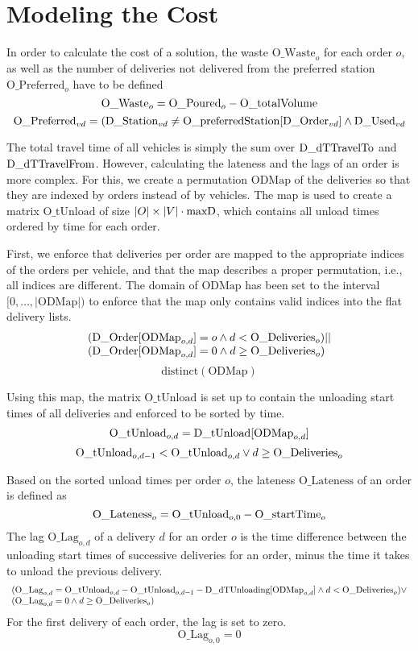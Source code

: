 \documentclass[a4paper]{article}
\begin{document}
\section{Modeling the Cost}

\newcommand{\ODMap}{\text{ODMap}}
\newcommand{\OWaste}{\text{O\_Waste}}
\newcommand{\OPreferred}{\text{O\_Preferred}}
\newcommand{\OLag}{\text{O\_Lag}}
\newcommand{\OLateness}{\text{O\_Lateness}}
\newcommand{\OtUnload}{\text{O\_tUnload}}

In order to calculate the cost of a solution, the waste $\OWaste_o$ for each order $o$, as well as the number of 
deliveries not delivered from the preferred station $\OPreferred_o$ have to be defined
\[
\OWaste_o = \OPoured_o - \OtotalVolume
\]
\[
\OPreferred_{vd} = (\DStation_{vd} \not = \text{O\_preferredStation}[ \DOrder_{vd} ] \wedge \DUsed_{vd}
\]

The total travel time of all vehicles is simply the sum over $\text{D\_dTTravelTo}$ and $\text{D\_dTTravelFrom}$. However, calculating the lateness and the lags of an
order is more complex. For this, we create a permutation $\ODMap$ of the deliveries so that they are indexed by orders instead of by vehicles.
The map is used to create a matrix $\OtUnload$ of size $|O| \times |V| \cdot \text{maxD}$, which contains all unload times ordered by time for each order.

First, we enforce that deliveries per order are mapped to the appropriate indices of the orders per vehicle, and that the map describes a proper 
permutation, i.e., all indices are different. The domain of $\ODMap$ has been set to the interval $[0,\dots,|\ODMap|)$ to enforce that the map only contains
valid indices into the flat delivery lists.
\[
\begin{array}{l}
(\DOrder[\ODMap_{o,d}] = o \wedge d < \ODeliveries_o) || \\
(\DOrder[\ODMap_{o,d}] = 0 \wedge d \geq \ODeliveries_o) 
\end{array}
\]
\[
\text{distinct}(\ODMap)
\]

Using this map, the matrix $\OtUnload$ is set up to contain the unloading start times of all deliveries and enforced to be sorted by time.
\[
\OtUnload_{o,d} = \DtUnload[\ODMap_{o,d}]
\]
\[
\OtUnload_{o,d-1} < \OtUnload_{o,d} \vee d \geq \ODeliveries_o
\]

Based on the sorted unload times per order $o$, the lateness $\OLateness$ of an order is defined as
\[
\OLateness_o = \OtUnload_{o,0} - \OstartTime_o
\]
The lag $\OLag_{o,d}$ of a delivery $d$ for an order $o$ is the time difference between the unloading start times of successive deliveries for an order, 
minus the time it takes to unload the previous delivery.
\[
\begin{array}{l}
(\OLag_{o,d} = \OtUnload_{o,d} - \OtUnload_{o,d-1} - \DdTUnloading[ \ODMap_{o,d} ] \wedge d < \ODeliveries_o) \vee \\
(\OLag_{o,d} = 0 \wedge d \geq \ODeliveries_o)
\end{array}
\]
For the first delivery of each order, the lag is set to zero.
\[
\OLag_{o,0} = 0
\]
\end{document}
